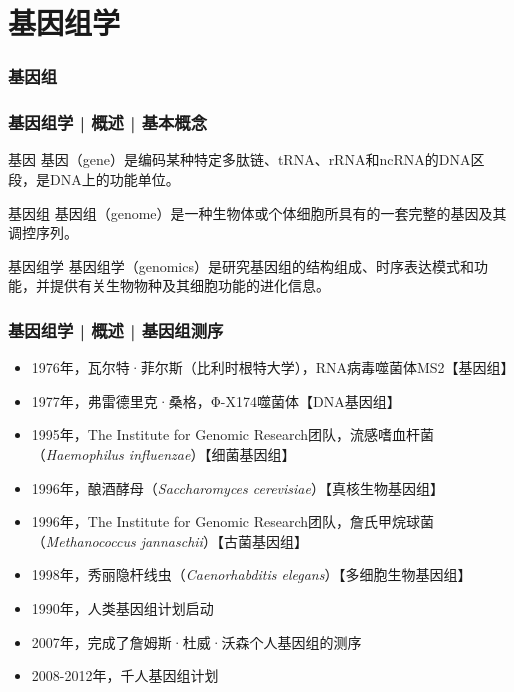 \section{基因组学}

\subsubsection{基因组}
\begin{frame}
  \frametitle{基因组学 | 概述 | 基本概念}
  \begin{block}{基因}
基因（gene）是编码某种特定多肽链、tRNA、rRNA和ncRNA的DNA区段，是DNA上的功能单位。
  \end{block}
  \pause
  \begin{block}{基因组}
 基因组（genome）是一种生物体或个体细胞所具有的一套完整的基因及其调控序列。
  \end{block}
  \pause
  \begin{block}{基因组学}
 基因组学（genomics）是研究基因组的结构组成、时序表达模式和功能，并提供有关生物物种及其细胞功能的进化信息。
  \end{block}
\end{frame}

\begin{frame}
  \frametitle{基因组学 | 概述 | 基因组测序}
  \begin{itemize}
    \item 1976年，瓦尔特·菲尔斯（比利时根特大学），RNA病毒噬菌体MS2【基因组】
    \item 1977年，弗雷德里克·桑格，Φ-X174噬菌体【DNA基因组】
    \item 1995年，The Institute for Genomic Research团队，流感嗜血杆菌（\textit{Haemophilus influenzae}）【细菌基因组】
    \item 1996年，酿酒酵母（\textit{Saccharomyces cerevisiae}）【真核生物基因组】
    \item 1996年，The Institute for Genomic Research团队，詹氏甲烷球菌（\textit{Methanococcus jannaschii}）【古菌基因组】
    \item 1998年，秀丽隐杆线虫（\textit{Caenorhabditis elegans}）【多细胞生物基因组】
    \item 1990年，人类基因组计划启动
    \item 2007年，完成了詹姆斯·杜威·沃森个人基因组的测序
    \item 2008-2012年，千人基因组计划
  \end{itemize}
\end{frame}

